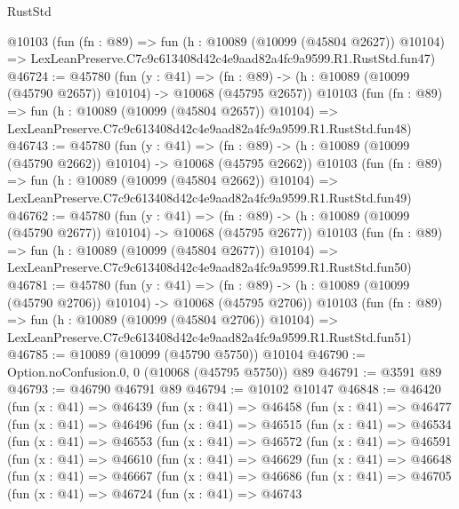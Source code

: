 \begin{lexlean}{RustStd}
\begin{coremodule}
    @10103
    (fun (fn : @89) =>
    fun (h : @10089 (@10099 (@45804 @2627)) @10104) =>
    LexLeanPreserve.C7c9c613408d42c4e9aad82a4fc9a9599.R1.RustStd.fun47)
@46724 := @45780
    (fun (y : @41) =>
    (fn : @89) -> (h : @10089 (@10099 (@45790 @2657)) @10104) -> @10068 (@45795 @2657))
    @10103
    (fun (fn : @89) =>
    fun (h : @10089 (@10099 (@45804 @2657)) @10104) =>
    LexLeanPreserve.C7c9c613408d42c4e9aad82a4fc9a9599.R1.RustStd.fun48)
@46743 := @45780
    (fun (y : @41) =>
    (fn : @89) -> (h : @10089 (@10099 (@45790 @2662)) @10104) -> @10068 (@45795 @2662))
    @10103
    (fun (fn : @89) =>
    fun (h : @10089 (@10099 (@45804 @2662)) @10104) =>
    LexLeanPreserve.C7c9c613408d42c4e9aad82a4fc9a9599.R1.RustStd.fun49)
@46762 := @45780
    (fun (y : @41) =>
    (fn : @89) -> (h : @10089 (@10099 (@45790 @2677)) @10104) -> @10068 (@45795 @2677))
    @10103
    (fun (fn : @89) =>
    fun (h : @10089 (@10099 (@45804 @2677)) @10104) =>
    LexLeanPreserve.C7c9c613408d42c4e9aad82a4fc9a9599.R1.RustStd.fun50)
@46781 := @45780
    (fun (y : @41) =>
    (fn : @89) -> (h : @10089 (@10099 (@45790 @2706)) @10104) -> @10068 (@45795 @2706))
    @10103
    (fun (fn : @89) =>
    fun (h : @10089 (@10099 (@45804 @2706)) @10104) =>
    LexLeanPreserve.C7c9c613408d42c4e9aad82a4fc9a9599.R1.RustStd.fun51)
@46785 := @10089 (@10099 (@45790 @5750)) @10104
@46790 := Option.noConfusion.{0, 0} (@10068 (@45795 @5750)) @89
@46791 := @3591 @89
@46793 := @46790 @46791 @89
@46794 := @10102 @10147
@46848 := @46420
    (fun (x : @41) =>
    @46439
      (fun (x : @41) =>
      @46458
        (fun (x : @41) =>
        @46477
          (fun (x : @41) =>
          @46496
            (fun (x : @41) =>
            @46515
              (fun (x : @41) =>
              @46534
                (fun (x : @41) =>
                @46553
                  (fun (x : @41) =>
                  @46572
                    (fun (x : @41) =>
                    @46591
                      (fun (x : @41) =>
                      @46610
                        (fun (x : @41) =>
                        @46629
                          (fun (x : @41) =>
                          @46648
                            (fun (x : @41) =>
                            @46667
                              (fun (x : @41) =>
                              @46686
                                (fun (x : @41) =>
                                @46705
                                  (fun (x : @41) =>
                                  @46724
                                    (fun (x : @41) =>
                                    @46743

\end{coremodule}
\end{lexlean}
